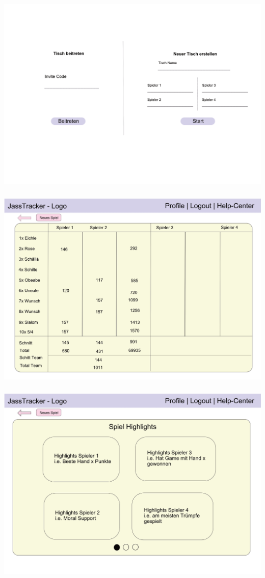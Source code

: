 \includegraphics[height=10cm, width=\textwidth]{resources/mockups/mockup-create-new-table.png}
\includegraphics[height=10cm, width=\textwidth]{resources/mockups/mockup-scoreboard.png}
\includegraphics[height=10cm, width=\textwidth]{resources/mockups/mockup-eof-hightlights.png}
